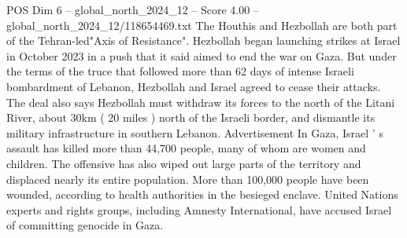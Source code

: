 \begin{textsample}{POS Dim 6 – global\_north\_2024\_12 – Score 4.00 – global\_north\_2024\_12/118654469.txt}
The Houthis and Hezbollah are both part of the Tehran-led"Axis of Resistance".
Hezbollah began launching strikes at Israel in October 2023 in a push that it said aimed to end the war on Gaza.
But under the terms of the truce that followed more than 62 days of intense Israeli bombardment of Lebanon, Hezbollah and Israel agreed to cease their attacks.
The deal also says Hezbollah must withdraw its forces to the north of the Litani River, about 30km ( 20 miles ) north of the Israeli border, and dismantle its military infrastructure in southern Lebanon.
Advertisement In Gaza, Israel ' s assault has killed more than 44,700 people, many of whom are women and children.
The offensive has also wiped out large parts of the territory and displaced nearly its entire population.
More than 100,000 people have been wounded, according to health authorities in the besieged enclave.
United Nations experts and rights groups, including Amnesty International, have accused Israel of committing genocide in Gaza.

\end{textsample}
